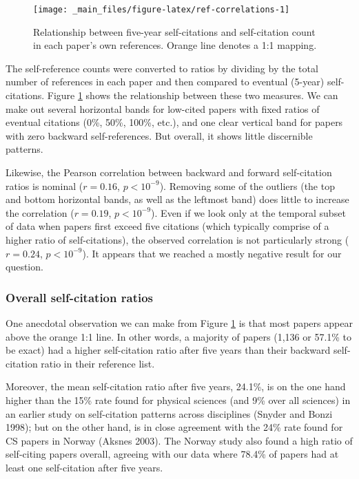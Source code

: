 \documentclass{article}
\begin{document}
\begin{figure}
\texttt{[image: \_main\_files/figure-latex/ref-correlations-1]} \caption{Relationship between five-year self-citations and self-citation count in each paper's own references. Orange line denotes a  1:1 mapping.}\label{fig:ref-correlations}
\end{figure}

The self-reference counts were converted to ratios by dividing by the total number of references in each paper and then compared to eventual (5-year) self-citations.
Figure \ref{fig:ref-correlations} shows the relationship between these two measures.
We can make out several horizontal bands for low-cited papers with fixed ratios of eventual citations (0\%, 50\%, 100\%, etc.), and one clear vertical band for papers with zero backward self-references.
But overall, it shows little discernible patterns.

Likewise, the Pearson correlation between backward and forward self-citation ratios is nominal
(\(r=0.16\), \(p<10^{-9}\)).
Removing some of the outliers (the top and bottom horizontal bands, as well as the leftmost band) does little to increase the correlation
(\(r=0.19\), \(p<10^{-9}\)).
Even if we look only at the temporal subset of data when papers first exceed five citations (which typically comprise of a higher ratio of self-citations),
the observed correlation is not particularly strong
(\(r=0.24\), \(p<10^{-9}\)).
It appears that we reached a mostly negative result for our question.

\hypertarget{overall-self-citation-ratios}{%
\subsubsection{Overall self-citation ratios}\label{overall-self-citation-ratios}}

One anecdotal observation we can make from Figure \ref{fig:ref-correlations} is that most papers appear above the orange 1:1 line.
In other words, a majority of papers
(1,136 or
57.1\%
to be exact) had a higher self-citation ratio after five years than their backward self-citation ratio in their reference list.

Moreover, the mean self-citation ratio after five years,
24.1\%,
is on the one hand higher than the 15\% rate found for physical sciences (and 9\% over all sciences) in an earlier study on self-citation patterns across disciplines (Snyder and Bonzi 1998); but on the other hand, is in close agreement with the 24\% rate found for CS papers in Norway (Aksnes 2003).
The Norway study also found a high ratio of self-citing papers overall, agreeing with our data where 78.4\%
of papers had at least one self-citation after five years.
\end{document}
